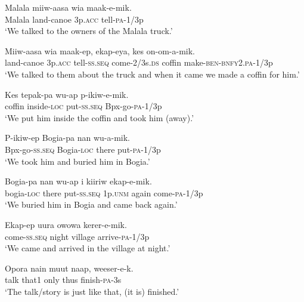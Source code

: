 {\ea\label{ex:a:x58}
\gll  Malala  miiw-aasa  wia  maak-e-mik. \\
Malala  land-canoe  3p.\textsc{acc}  tell-\textsc{pa}-1/3p \\
\glt ‘We talked to the owners of the Malala truck.’ \\
\z


\ea\label{ex:a:x59}
\gll  Miiw-aasa  wia  maak-ep,  ekap-eya,  kes          on-om-a-mik. \\
land-canoe  3p.\textsc{acc}  tell-\textsc{ss.seq}  come-2/3s.\textsc{ds}  coffin   make-\textsc{ben}-\textsc{bnfy}2.\textsc{pa}-1/3p \\


\glt ‘We talked to them about the truck and when it came we made a coffin for him.’ \\
\z


\ea\label{ex:a:x60}
\gll  Kes  tepak-pa  wu-ap  p-ikiw-e-mik. \\
coffin  inside-\textsc{loc}  put-\textsc{ss.seq}  Bpx-go-\textsc{pa}-1/3p \\
\glt ‘We put him inside the coffin and took him (away).’ \\
\z


\ea\label{ex:a:x61}
\gll  P-ikiw-ep  Bogia-pa  nan  wu-a-mik. \\
Bpx-go-\textsc{ss.seq}  Bogia-\textsc{loc}  there  put-\textsc{pa}-1/3p \\
\glt ‘We took him and buried him in Bogia.’ \\
\z


\ea\label{ex:a:x62}
\gll  Bogia-pa  nan  wu-ap  i  kiiriw  ekap-e-mik. \\
bogia-\textsc{loc}  there  put-\textsc{ss.seq}  1p.\textsc{unm}  again  come-\textsc{pa}-1/3p \\
\glt ‘We buried him in Bogia and came back again.’ \\
\z


\ea\label{ex:a:x63}
\gll  Ekap-ep  uura  owowa  kerer-e-mik. \\
come-\textsc{ss.seq}  night  village  arrive-\textsc{pa}-1/3p \\
\glt ‘We came and arrived in the village at night.’ \\
\z


\ea\label{ex:a:x64}
\gll  Opora  nain  muut  naap,  weeser-e-k. \\
talk  that1  only  thus  finish-\textsc{pa}-3s \\
\glt ‘The talk/story is just like that, (it is) finished.’ \\
\z


}
